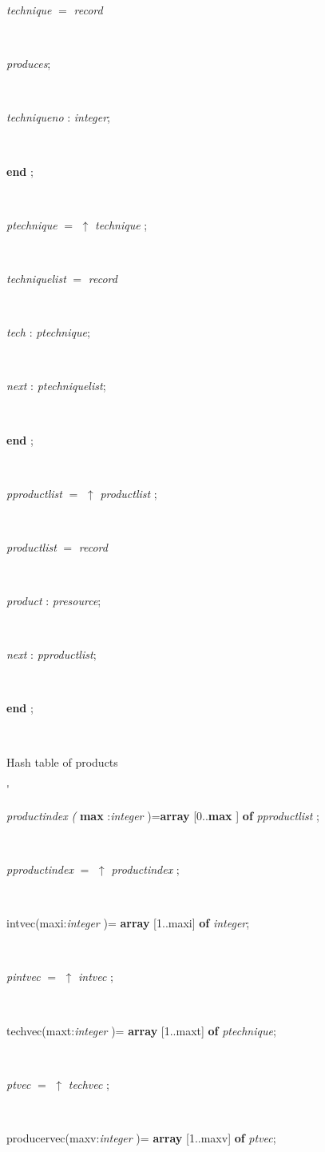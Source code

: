 \begin{tabbing}
\+\parbox{14cm}{\textsf{\textit{technique} $=$ \textit{record}}}\\
\parbox{14cm}{\textsf{\textit{produces}}; }\\
\parbox{14cm}{\textsf{\textit{techniqueno} : \textit{integer}}; }\\
\<\-\parbox{14cm}{\textsf{\textbf{end} ;}}\\
\parbox{14cm}{\textsf{\textit{ptechnique} $=$ $\uparrow$ \textit{technique} }; }\\
\+\parbox{14cm}{\textsf{\textit{techniquelist} $=$ \textit{record}}}\\
\parbox{14cm}{\textsf{\textit{tech} : \textit{ptechnique}}; }\\
\parbox{14cm}{\textsf{\textit{next} : \textit{ptechniquelist}}; }\\
\<\-\parbox{14cm}{\textsf{\textbf{end} ;}}\\
\parbox{14cm}{\textsf{\textit{pproductlist} $=$ $\uparrow$ \textit{productlist} }; }\\
\+\parbox{14cm}{\textsf{\textit{productlist} $=$ \textit{record}}}\\
\parbox{14cm}{\textsf{\textit{product} : \textit{presource}}; }\\
\parbox{14cm}{\textsf{\textit{next} : \textit{pproductlist}}; }\\
\<\-\parbox{14cm}{\textsf{\textbf{end} ;}}\\
\<\<\parbox{3.5cm}{\scriptsize{Hash table of products}}\'\>\>\parbox{14cm}{\textsf{\textit{productindex} \textit{(} \textbf{max} :\textit{integer} )=\textbf{array} [0..\textbf{max}  ] \textbf{of}  \textit{pproductlist} ;}}\\
\parbox{14cm}{\textsf{\textit{pproductindex} $=$ $\uparrow$ \textit{productindex} }; }\\
\parbox{14cm}{intvec(maxi:\textsf{\textit{integer} )=} \textbf{ array } \textsf{\textit{}[1..maxi]} \textbf{ of } \textsf{\textit{integer}}; }\\
\parbox{14cm}{\textsf{\textit{pintvec} $=$ $\uparrow$ \textit{intvec} }; }\\
\parbox{14cm}{techvec(maxt:\textsf{\textit{integer} )= } \textbf{ array } \textsf{\textit{}[1..maxt]} \textbf{ of } \textsf{\textit{ptechnique}}; }\\
\parbox{14cm}{\textsf{\textit{ptvec} $=$ $\uparrow$ \textit{techvec} }; }\\
\parbox{14cm}{producervec(maxv:\textsf{\textit{integer} )= } \textbf{ array } \textsf{\textit{}[1..maxv]} \textbf{ of } \textsf{\textit{ptvec}}; }\\

\end{tabbing}
